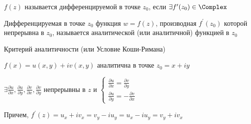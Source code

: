 \documentclass[12pt]{article}
\begin{document}
\Def $f(z)$ называется дифференцируемой в точке $z_0$, если $\exists f^\prime(z_0) \in \Complex$

\Defs Дифференцируемая в точке $z_0$ функция $w = f(z)$, производная $f^\prime(z_0)$ которой непрерывна в $z_0$,
называется аналитической (или аналитичной) функцией в $z_0$

\begin{MyTheorem}
    \Ths Критерий аналитичности (или Условие Коши-Римана)

    \begin{center}
        $f(x) = u(x, y) + i v(x, y)$ аналитична в точке $z_0 = x + iy$ 
        
    
        $\exists \frac{\partial u}{\partial x}, \frac{\partial u}{\partial y}, \frac{\partial v}{\partial x}, \frac{\partial v}{\partial y}$ непрерывны в $z$ и
        $\begin{cases}\frac{\partial u}{\partial x} = \frac{\partial v}{\partial y} \\ \frac{\partial u}{\partial y} = -\frac{\partial v}{\partial x}\end{cases}$
    \end{center}

    Причем, $f^\prime(z) = u_x + i v_x = v_y - i u_y = u_x - i u_y = v_y + i v_x$
\end{MyTheorem}
\end{document}
